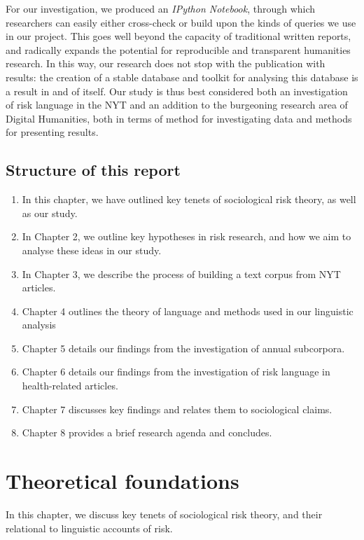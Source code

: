 \documentclass{report}
\begin{document}
For our investigation, we produced an \emph{IPython Notebook}, through which researchers can easily either cross-check or build upon the kinds of queries we use in our project. This goes well beyond the capacity of traditional written reports, and radically expands the potential for reproducible and transparent humanities research. In this way, our research does not stop with the publication with results: the creation of a stable database and toolkit for analysing this database is a result in and of itself. Our study is thus best considered both an investigation of risk language in the NYT and an addition to the burgeoning research area of Digital Humanities, both in terms of method for investigating data and methods for presenting results.

\section{Structure of this report}

\begin{enumerate}
\item In this chapter, we have outlined key tenets of sociological risk theory, as well as our study.
\item In Chapter 2, we outline key hypotheses in risk research, and how we aim to analyse these ideas in our study.
\item In Chapter 3, we describe the process of building a text corpus from NYT articles.
\item Chapter 4 outlines the theory of language and methods used in our linguistic analysis
\item Chapter 5 details our findings from the investigation of annual subcorpora.
\item Chapter 6 details our findings from the investigation of risk language in health-related articles.
\item Chapter 7 discusses key findings and relates them to sociological claims.
\item Chapter 8 provides a brief research agenda and concludes.
\end{enumerate}

\chapter{Theoretical foundations}

In this chapter, we discuss key tenets of sociological risk theory, and their relational to linguistic accounts of risk.
\end{document}
